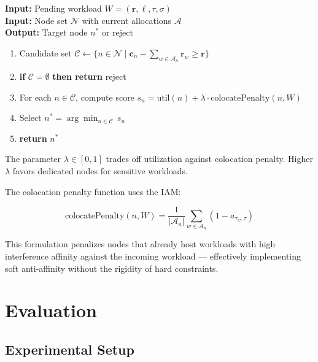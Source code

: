 \documentclass[12pt,letterpaper,twoside]{report}
\begin{document}
\begin{tcolorbox}[colback=white,colframe=uwaterlooNavy,title={\textbf{Algorithm 1:} EdgeSched Online Placement}]
\label{alg:placement}
\textbf{Input:} Pending workload \(W = (\mathbf{r}, \ell, \tau, \sigma)\)\\
\textbf{Input:} Node set \(\mathcal{N}\) with current allocations \(\mathcal{A}\)\\
\textbf{Output:} Target node \(n^*\) or reject
\vspace{4pt}
\begin{enumerate}[leftmargin=*,nosep]
    \item Candidate set \(\mathcal{C} \leftarrow \{n \in \mathcal{N} \mid \mathbf{c}_n - \sum_{w \in \mathcal{A}_n} \mathbf{r}_w \geq \mathbf{r}\}\)
    \item \textbf{if} \(\mathcal{C} = \emptyset\) \textbf{then return} reject
    \item For each \(n \in \mathcal{C}\), compute score
          \(s_n = \text{util}(n) + \lambda \cdot \text{colocatePenalty}(n, W)\)
    \item Select \(n^* = \arg\min_{n \in \mathcal{C}} \, s_n\)
    \item \textbf{return} \(n^*\)
\end{enumerate}
\vspace{4pt}
{\small The parameter \(\lambda \in [0, 1]\) trades off utilization against colocation penalty. Higher \(\lambda\) favors dedicated nodes for sensitive workloads.}
\end{tcolorbox}

\vspace{6pt}
The colocation penalty function uses the IAM:

\[
\text{colocatePenalty}(n, W) =
\frac{1}{|\mathcal{A}_n|} \sum_{w \in \mathcal{A}_n} (1 - a_{\tau_w, \tau})
\]

This formulation penalizes nodes that already host workloads with high interference affinity against the incoming workload --- effectively implementing soft anti-affinity without the rigidity of hard constraints.

\chapter{Evaluation}\label{ch:eval}

\section{Experimental Setup}
\end{document}
